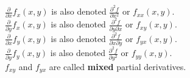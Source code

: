 \documentclass[11pt]{article}
\begin{document}
\(\frac{\partial}{\partial x} f_x (x, y)\) is also denoted \(\frac{\partial^2 f}{\partial x^2}\) or \(f_{xx}(x, y)\).
\\[0pt]

\(\frac{\partial}{\partial y} f_x (x, y)\) is also denoted \(\frac{\partial^2 f}{\partial y \partial x}\) or \(f_{xy}(x, y)\).
\\[0pt]

\(\frac{\partial}{\partial x} f_y (x, y)\) is also denoted \(\frac{\partial^2 f}{\partial x \partial y}\) or \(f_{yx}(x, y)\).
\\[0pt]

\(\frac{\partial}{\partial y} f_y (x, y)\) is also denoted \(\frac{\partial^2 f}{\partial y^2}\) or \(f_{yy}(x, y)\).
\\[0pt]

\(f_{xy}\) and \(f_{yx}\) are called \textbf{mixed} partial derivatives.
\end{document}
